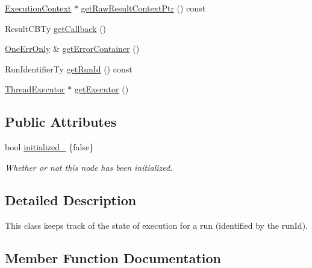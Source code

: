 \begin{DoxyCompactItemize}
\item 
\hyperlink{classglow_1_1_execution_context}{Execution\+Context} $\ast$ \hyperlink{classglow_1_1runtime_1_1_execution_state_a53a9f874acff138302be72f0b615a03a}{get\+Raw\+Result\+Context\+Ptr} () const
\item 
Result\+C\+B\+Ty \hyperlink{classglow_1_1runtime_1_1_execution_state_ab9f5585825bf7177a2607a7c2fd29247}{get\+Callback} ()
\item 
\hyperlink{classglow_1_1_one_err_only}{One\+Err\+Only} \& \hyperlink{classglow_1_1runtime_1_1_execution_state_ae3af7aa022ac86ebf86acd31b68decb5}{get\+Error\+Container} ()
\item 
Run\+Identifier\+Ty \hyperlink{classglow_1_1runtime_1_1_execution_state_a0bbac1a5ff3a157183a16e63c81a4f23}{get\+Run\+Id} () const
\item 
\hyperlink{classglow_1_1_thread_executor}{Thread\+Executor} $\ast$ \hyperlink{classglow_1_1runtime_1_1_execution_state_a376ef4a61f38f8b4266b7dc63dedb941}{get\+Executor} ()
\end{DoxyCompactItemize}
\subsection*{Public Attributes}
\begin{DoxyCompactItemize}
\item 
\mbox{\label{classglow_1_1runtime_1_1_execution_state_a81379f5485a5b547d279c8ff0ea6b05c}} 
bool \hyperlink{classglow_1_1runtime_1_1_execution_state_a81379f5485a5b547d279c8ff0ea6b05c}{initialized\+\_\+} \{false\}
\begin{DoxyCompactList}\small\item\em Whether or not this node has been initialized. \end{DoxyCompactList}\end{DoxyCompactItemize}


\subsection{Detailed Description}
This class keeps track of the state of execution for a run (identified by the run\+Id). 

\subsection{Member Function Documentation}
\mbox{\label{classglow_1_1runtime_1_1_execution_state_aecb0acd57723284fe11b39e34886bd90}} 
